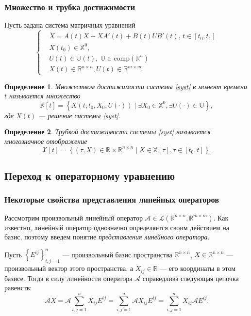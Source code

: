 \documentclass[12pt]{article}
\theoremstyle{rusdef}
\newtheorem{definition}{Определение}
\newcommand{\R}{\ensuremath{\mathbb{R}}} %
\begin{document}
\subsubsection*{Множество и трубка достижимости}
Пусть задана система матричных уравнений
\begin{equation}\label{syst}
\left\{
\begin{aligned}
&\dot{X} = A(t)X + XA'(t) + B(t)UB'(t), \, t \in [t_0,t_1]\\
&X(t_0) \in \mathbb{X}^0,\\
&U(t) \in \mathbb{U}(t), \; \mathbb{U} \in \mathrm{comp}(\R^n)\\
&X(t) \in \R^{n \times n}, U(t) \in \R^{m \times m}.
\end{aligned}
\right.
\end{equation}

\begin{definition}
Множеством достижимости системы \eqref{syst} в момент времени $t$ называется множество
$$
\mathbb{X}[t] = \left\{ X(t; t_0, X_0, U(\cdot) ) \mid \exists X_0 \in \mathbb{X}^0, \exists U(\cdot) \in \mathbb{U}  \right\},
$$
где $X(t)$ --- решение системы \eqref{syst}.
\end{definition}

\begin{definition}
Трубкой достижимости системы \eqref{syst} называется многозначное отображение
$$
\mathscr{X}[t] = \left\{ (\tau,X) \in \R \times \R^{n \times n} \mid X \in \mathbb{X}[\tau], \tau \in [t_0,t] \right\}.
$$
\end{definition}

\subsection{Переход к операторному уравнению}
\subsubsection*{Некоторые свойства представления линейных операторов}
Рассмотрим произвольный линейный оператор $\mathcal{A} \in \mathscr{L}(\R^{n \times n},\R^{m \times m})$. Как известно, линейный оператор однозначно определяется своим действием на базис, поэтому введем понятие \textit{представления линейного оператора}.

Пусть $\left\{ E^{ij} \right\}_{i,j=1}^{n}$ --- произвольный базис пространства $\R^{n \times n}$, $X \in \R^{n \times n}$ --- произвольный вектор этого пространства, а $X_{ij} \in \R$ --- его координаты в этом базисе. Тогда в силу линейности оператора $\mathcal{A}$ справедлива следующая цепочка равенств:
$$
\mathcal{A}X = \mathcal{A} \sum\limits_{i,j = 1}^{n} X_{ij} E^{ij} = \sum\limits_{i,j = 1}^{n} \mathcal{A} X_{ij} E^{ij} = \sum\limits_{i,j = 1}^{n} X_{ij} \mathcal{A} E^{ij}.
$$
\end{document}
